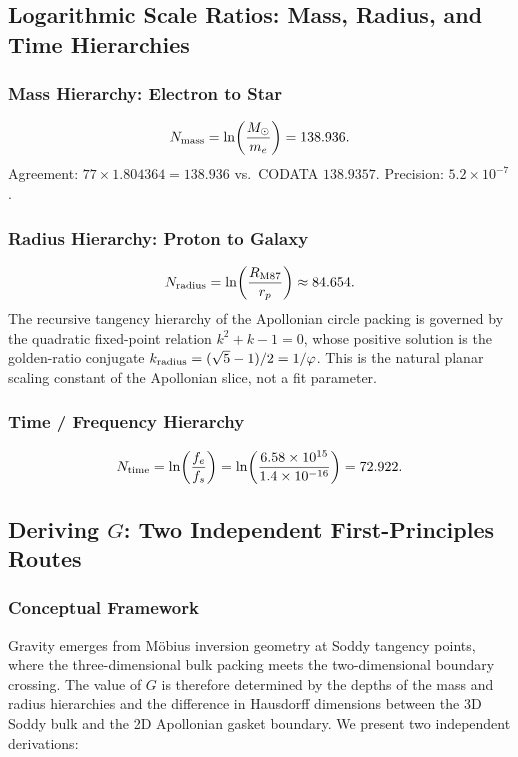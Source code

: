 \documentclass[11pt,a4paper]{article}
\begin{document}
\subsection{Logarithmic Scale Ratios: Mass, Radius, and Time Hierarchies}

\subsubsection{Mass Hierarchy: Electron to Star}

\[
N_{\rm mass} = \ln\!\left(\frac{M_\odot}{m_e}\right) = 138.936.
\]
Agreement: $77 \times 1.804364 = 138.936$ vs.\ CODATA $138.9357$. Precision: $5.2\times10^{-7}$.

\subsubsection{Radius Hierarchy: Proton to Galaxy}

\[
N_{\rm radius} = \ln\!\left(\frac{R_{\rm M87}}{r_p}\right) \approx 84.654.
\]
The recursive tangency hierarchy of the Apollonian circle packing is governed by the quadratic fixed-point relation $k^2 + k - 1 = 0$, whose positive solution is the golden-ratio conjugate $k_{\rm radius} = (\sqrt{5}-1)/2 = 1/\varphi$. This is the natural planar scaling constant of the Apollonian slice, not a fit parameter.

\subsubsection{Time / Frequency Hierarchy}

\[
N_{\rm time} = \ln\!\left(\frac{f_e}{f_s}\right)
  = \ln\!\left(\frac{6.58\times10^{15}}{1.4\times10^{-16}}\right)
  = 72.922.
\]

\subsection{Deriving $G$: Two Independent First-Principles Routes}
\label{sec:G_deriv}

\subsubsection{Conceptual Framework}

Gravity emerges from Möbius inversion geometry at Soddy tangency points, where the three-dimensional bulk packing meets the two-dimensional boundary crossing. The value of $G$ is therefore determined by the depths of the mass and radius hierarchies and the difference in Hausdorff dimensions between the 3D Soddy bulk and the 2D Apollonian gasket boundary. We present two independent derivations:
\end{document}
